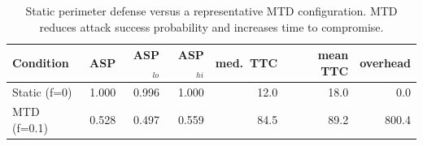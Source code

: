 \begin{table}[t]
\centering
\caption{Static perimeter defense versus a representative MTD configuration. MTD reduces attack success probability and increases time to compromise.}
\label{tab:baseline}
\begin{tabular}{lrrrrrr}
\toprule
Condition & ASP & ASP$_{lo}$ & ASP$_{hi}$ & med.\ TTC & mean TTC & overhead \\
\midrule
Static (f=0) & 1.000 & 0.996 & 1.000 & 12.0 & 18.0 & 0.0 \\
MTD (f=0.1) & 0.528 & 0.497 & 0.559 & 84.5 & 89.2 & 800.4 \\
\bottomrule
\end{tabular}
\end{table}
